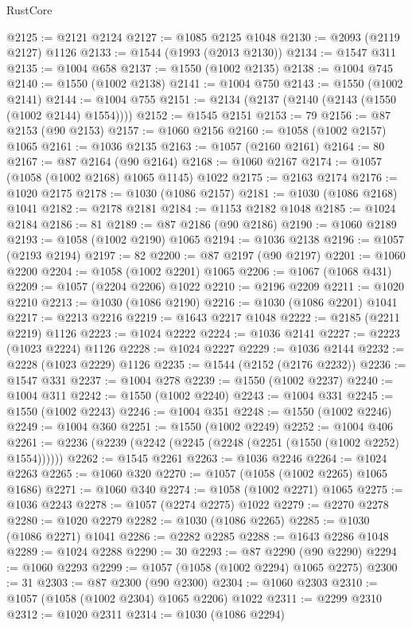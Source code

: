 \begin{lexlean}{RustCore}
\begin{coremodule}
@2125 := @2121 @2124
@2127 := @1085 @2125 @1048
@2130 := @2093 (@2119 @2127) @1126
@2133 := @1544 (@1993 (@2013 @2130))
@2134 := @1547 @311
@2135 := @1004 @658
@2137 := @1550 (@1002 @2135)
@2138 := @1004 @745
@2140 := @1550 (@1002 @2138)
@2141 := @1004 @750
@2143 := @1550 (@1002 @2141)
@2144 := @1004 @755
@2151 := @2134 (@2137 (@2140 (@2143 (@1550 (@1002 @2144) @1554))))
@2152 := @1545 @2151
@2153 := 79
@2156 := @87 @2153 (@90 @2153)
@2157 := @1060 @2156
@2160 := @1058 (@1002 @2157) @1065
@2161 := @1036 @2135
@2163 := @1057 (@2160 @2161)
@2164 := 80
@2167 := @87 @2164 (@90 @2164)
@2168 := @1060 @2167
@2174 := @1057 (@1058 (@1002 @2168) @1065 @1145) @1022
@2175 := @2163 @2174
@2176 := @1020 @2175
@2178 := @1030 (@1086 @2157)
@2181 := @1030 (@1086 @2168) @1041
@2182 := @2178 @2181
@2184 := @1153 @2182 @1048
@2185 := @1024 @2184
@2186 := 81
@2189 := @87 @2186 (@90 @2186)
@2190 := @1060 @2189
@2193 := @1058 (@1002 @2190) @1065
@2194 := @1036 @2138
@2196 := @1057 (@2193 @2194)
@2197 := 82
@2200 := @87 @2197 (@90 @2197)
@2201 := @1060 @2200
@2204 := @1058 (@1002 @2201) @1065
@2206 := @1067 (@1068 @431)
@2209 := @1057 (@2204 @2206) @1022
@2210 := @2196 @2209
@2211 := @1020 @2210
@2213 := @1030 (@1086 @2190)
@2216 := @1030 (@1086 @2201) @1041
@2217 := @2213 @2216
@2219 := @1643 @2217 @1048
@2222 := @2185 (@2211 @2219) @1126
@2223 := @1024 @2222
@2224 := @1036 @2141
@2227 := @2223 (@1023 @2224) @1126
@2228 := @1024 @2227
@2229 := @1036 @2144
@2232 := @2228 (@1023 @2229) @1126
@2235 := @1544 (@2152 (@2176 @2232))
@2236 := @1547 @331
@2237 := @1004 @278
@2239 := @1550 (@1002 @2237)
@2240 := @1004 @311
@2242 := @1550 (@1002 @2240)
@2243 := @1004 @331
@2245 := @1550 (@1002 @2243)
@2246 := @1004 @351
@2248 := @1550 (@1002 @2246)
@2249 := @1004 @360
@2251 := @1550 (@1002 @2249)
@2252 := @1004 @406
@2261 := @2236 (@2239 (@2242 (@2245 (@2248 (@2251 (@1550 (@1002 @2252) @1554))))))
@2262 := @1545 @2261
@2263 := @1036 @2246
@2264 := @1024 @2263
@2265 := @1060 @320
@2270 := @1057 (@1058 (@1002 @2265) @1065 @1686)
@2271 := @1060 @340
@2274 := @1058 (@1002 @2271) @1065
@2275 := @1036 @2243
@2278 := @1057 (@2274 @2275) @1022
@2279 := @2270 @2278
@2280 := @1020 @2279
@2282 := @1030 (@1086 @2265)
@2285 := @1030 (@1086 @2271) @1041
@2286 := @2282 @2285
@2288 := @1643 @2286 @1048
@2289 := @1024 @2288
@2290 := 30
@2293 := @87 @2290 (@90 @2290)
@2294 := @1060 @2293
@2299 := @1057 (@1058 (@1002 @2294) @1065 @2275)
@2300 := 31
@2303 := @87 @2300 (@90 @2300)
@2304 := @1060 @2303
@2310 := @1057 (@1058 (@1002 @2304) @1065 @2206) @1022
@2311 := @2299 @2310
@2312 := @1020 @2311
@2314 := @1030 (@1086 @2294)

\end{coremodule}
\end{lexlean}
